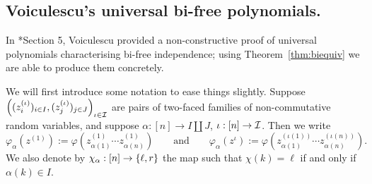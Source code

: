 \subsection{Voiculescu's universal bi-free polynomials.}
In \cite{voiculescu2014free}*{Section 5}, Voiculescu provided a non-constructive proof of universal polynomials characterising bi-free independence; using Theorem~\ref{thm:biequiv} we are able to produce them concretely.

We will first introduce some notation to ease things slightly.
Suppose $\left((z_i^{(\iota)})_{i\in I}, (z_j^{(\iota)})_{j\in J}\right)_{\iota\in\mathcal{I}}$ are pairs of two-faced families of non-commutative random variables, and suppose $\alpha : [n] \to I \coprod J$, $\iota : [n] \to \mathcal{I}$.
Then we write
$$\varphi_\alpha(z^{(1)}) := \varphi(z_{\alpha(1)}^{(1)}\cdots z_{\alpha(n)}^{(1)})
\qquad\text{and}\qquad
\varphi_\alpha(z^\iota) := \varphi(z_{\alpha(1)}^{(\iota(1))}\cdots z_{\alpha(n)}^{(\iota(n))}).$$
We also denote by $\chi_\alpha : [n] \to \left\{\ell, r\right\}$ the map such that $\chi(k) = \ell$ if and only if $\alpha(k) \in I$.

